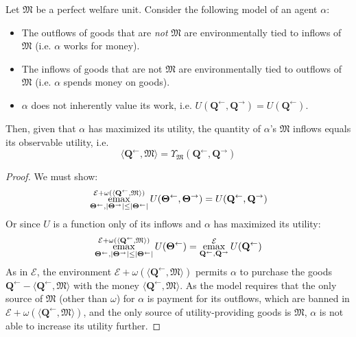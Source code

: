 \documentclass[smallextended]{svjour3}
\newcommand{\economy}{\ensuremath{\mathcal{E}}}
\newcommand{\emax}{\ensuremath{\operatornamewithlimits{emax}}}
\newcommand{\quantl}{\ensuremath{\mathbf{Q}}} %
\newcommand{\quantg}{\ensuremath{\mathbf{\Theta}}} %
\newcommand{\agenta}{\ensuremath{\alpha}}
\newcommand{\agentz}{\ensuremath{\omega}}
\newcommand{\money}{\ensuremath{\mathfrak{M}}}
\newcommand{\utility}{\ensuremath{U}}
\newcommand{\outility}{\ensuremath{\Upsilon}}
\begin{document}
\begin{theorem}
    \label{thm:gdp}
    Let $\money$ be a perfect welfare unit. Consider the following model of an agent $\agenta$:
    \begin{itemize}
        \item The outflows of goods that are \emph{not} $\money$ are environmentally tied to inflows of $\money$ (i.e. $\agenta$ works for money).
        \item The inflows of goods that are not $\money$ are environmentally tied to outflows of $\money$ (i.e. $\agenta$ spends money on goods).
        \item $\agenta$ does not inherently value its work, i.e. $\utility(\quantl^\leftarrow, \quantl^\rightarrow)=\utility(\quantl^\leftarrow)$. 
    \end{itemize}
    Then, given that $\agenta$ has maximized its utility, the quantity of $\agenta$'s $\money$ inflows equals its observable utility, i.e.
    \begin{equation}
        \label{eq:gdp}
        \langle \quantl^\leftarrow, \money \rangle = \outility_\money(\quantl^\leftarrow, \quantl^\rightarrow)
    \end{equation}
\end{theorem}
\begin{proof}
    We must show:
    \begin{equation*}
        \emax\limits_{\quantg^\leftarrow,|\quantg^\rightarrow|\le|\quantg^\leftarrow|}^{\economy + \agentz\left(\langle \quantl^\leftarrow, \money\rangle\right)} \utility(\quantg^\leftarrow, \quantg^\rightarrow) = \utility(\quantl^\leftarrow, \quantl^\rightarrow)
    \end{equation*}
    Or since $\utility$ is a function only of its inflows and $\agenta$ has maximized its utility:
    \begin{equation*}
        \emax\limits_{\quantg^\leftarrow,|\quantg^\rightarrow|\le|\quantg^\leftarrow|}^{\economy + \agentz\left(\langle \quantl^\leftarrow, \money\rangle\right)} \utility(\quantg^\leftarrow) = \emax_{\quantl^\leftarrow,\quantl^\rightarrow}^\economy \utility(\quantl^\leftarrow)
    \end{equation*}
    As in $\economy$, the environment $\economy+\agentz(\langle \quantl^\leftarrow, \money\rangle)$ permits $\agenta$ to purchase the goods $\quantl^\leftarrow - \langle \quantl^\leftarrow, \money\rangle$ with the money $\langle \quantl^\leftarrow, \money\rangle$. As the model requires that the only source of $\money$ (other than $\agentz$) for $\agenta$ is payment for its outflows, which are banned in $\economy+\agentz(\langle \quantl^\leftarrow, \money\rangle)$, and the only source of utility-providing goods is $\money$, $\agenta$ is not able to increase its utility further.
\end{proof}
\end{document}
